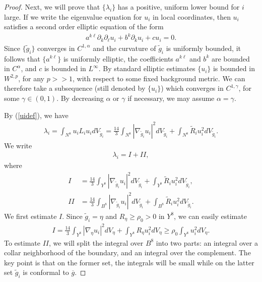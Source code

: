 \documentclass{amsart}
\newcommand{\Ri}{\widetilde{R}_i}
\newcommand{\di}{dV_{\widetilde{g}_i}}
\newcommand{\wti}{\widetilde{g}_i}
\theoremstyle{definition}
\theoremstyle{remark}
\numberwithin{equation}{section}
\begin{document}
\begin{proof}
Next, we will prove that $\{\lambda_i \}$ has a positive, uniform lower bound for $i$ large.  If we write the eigenvalue equation for $u_i$ in local coordinates, then $u_i$ satisfies a second order elliptic equation of the form
\begin{align*}
a^{k \ell} \partial_k \partial_{\ell} u_i + b^k \partial_k u_i + c u_i = 0.
\end{align*}
Since $\{ \wti \}$ converges in $C^{1,\alpha}$ and the curvature of $\wti$ is uniformly bounded, it follows that $\{ a^{k  \ell}\}$ is uniformly elliptic, the coefficients $a^{k \ell}$ and $b^k$ are bounded in $C^{\alpha}$, and $c$ is bounded in $L^{\infty}$.  By standard elliptic estimates $\{ u_i \}$ is bounded in $W^{2,p}$, for any $p >> 1$, with respect to some fixed background metric.  We can therefore take a subsequence (still denoted by $\{ u_i \}$) which converges in $C^{1,\gamma}$, for some $\gamma \in (0,1)$.   By decreasing $\alpha$ or $\gamma$ if necessary, we may assume $\alpha = \gamma$.

By (\ref{uidef}), we have
\begin{align*}
\lambda_i = \int_{N^8} u_i L_i u_i \di
= \frac{14}{3} \int_{N^8} |\nabla_{\wti} u_i |^2 \di +  \int_{N^8} \Ri u_i^2 \di.\end{align*}
We write
\begin{align} \label{ev1} \lambda_i=I + II,\end{align}
where
\begin{align*}
I&=\frac{14}{3} \int_{Y^8} |\nabla_{\wti} u_i |^2 \di +  \int_{Y^8} \Ri u_i^2 \di,\\
II&=\frac{14}{3} \int_{B^8} |\nabla_{\wti} u_i |^2 \di +  \int_{B^8} \Ri u_i^2 \di.
\end{align*}
We first estimate $I$. Since $\widetilde{g}_i=\eta$ and
$R_{\eta} \geq \rho_0 > 0$ in $Y^8$, we can easily estimate
\begin{align} \label{I}
I =\frac{14}{3} \int_{Y^8} |\nabla_{\eta} u_i |^2 dV_{\eta} +  \int_{Y^8} R_{\eta} u_i^2 dV_{\eta}
\geq \rho_0 \int_{Y^8}  u_i^2 dV_{\eta}.
\end{align}
To estimate $II$, we will split the integral over $B^8$ into two parts: an integral over a collar neighborhood of the boundary, and an integral over the complement.  The key point is that on the former set, the integrals will be small while on the latter set $\wti$ is conformal to $\overline{g}$.


\end{proof}
\end{document}
